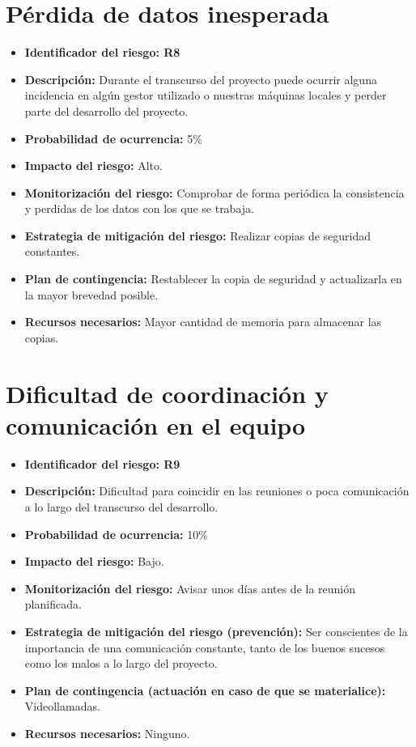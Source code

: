 \section{Pérdida de datos inesperada}
\begin{itemize}
	\item \textbf{Identificador del riesgo: R8}
	\item \textbf{Descripción: } Durante el transcurso del proyecto puede ocurrir alguna incidencia en algún gestor utilizado o nuestras máquinas locales y perder parte del desarrollo del proyecto.
	\item \textbf{Probabilidad de ocurrencia: } 5\%
	\item \textbf{Impacto del riesgo: } Alto.
	\item \textbf{Monitorización del riesgo: } Comprobar de forma periódica la consistencia y perdidas de los datos con los que se trabaja.
	\item \textbf{Estrategia de mitigación del riesgo: } Realizar copias de seguridad constantes.
	\item \textbf{Plan de contingencia: } Restablecer la copia de seguridad y actualizarla en la mayor brevedad posible.
	\item \textbf{Recursos necesarios: } Mayor cantidad de memoria para almacenar las copias.
\end{itemize}

\section{Dificultad de coordinación y comunicación en el equipo}
\begin{itemize}
	\item \textbf{Identificador del riesgo: R9}
	\item \textbf{Descripción: } Dificultad para coincidir en las reuniones o poca comunicación a lo largo del transcurso del desarrollo.
	\item \textbf{Probabilidad de ocurrencia: } 10\%
	\item \textbf{Impacto del riesgo: } Bajo.
	\item \textbf{Monitorización del riesgo: } Avisar unos días antes de la reunión planificada.
	\item \textbf{Estrategia de mitigación del riesgo (prevención): } Ser conscientes de la importancia de una comunicación constante, tanto de los buenos sucesos como los malos a lo largo del proyecto.
	\item \textbf{Plan de contingencia (actuación en caso de que se materialice): } Videollamadas.
	\item \textbf{Recursos necesarios: } Ninguno.
\end{itemize}

